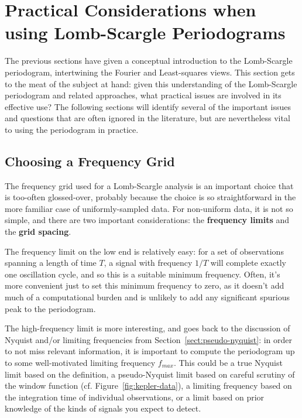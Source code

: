 \documentclass[preprint]{aastex}
\newcommand{\fig}[1]{Figure~\ref{fig:#1}}
\newcommand{\Sect}[1]{Section~\ref{sect:#1}}
\newcommand{\sect}[1]{\Sect{#1}}
\newcommand{\sectlabel}[1]{\label{sect:#1}}
\begin{document}
\section{Practical Considerations when using Lomb-Scargle Periodograms}
\sectlabel{practical-considerations}
The previous sections have given a conceptual introduction to the Lomb-Scargle
periodogram, intertwining the Fourier and Least-squares views.
This section gets to the meat of the subject at hand:
given this understanding of the Lomb-Scargle periodogram and related
approaches, what practical issues are involved in its effective use?
The following sections will identify several of the important issues and
questions that are often ignored in the literature, but are nevertheless
vital to using the periodogram in practice.

\subsection{Choosing a Frequency Grid}
\sectlabel{frequency-grid}
The frequency grid used for a Lomb-Scargle analysis is an important choice
that is too-often glossed-over, probably because the choice is so
straightforward in the more familiar case of uniformly-sampled data.
For non-uniform data, it is not so simple, and there are two important
considerations: the {\bf frequency limits} and the {\bf grid spacing}.

The frequency limit on the low end is relatively easy: for a set of observations
spanning a length of time $T$,
a signal with frequency $1/T$ will complete exactly one oscillation cycle,
and so this is a suitable minimum frequency.
Often, it's more convenient just to set this minimum frequency to zero, as it
doesn't add much of a computational burden and is unlikely to add any
significant spurious peak to the periodogram.

The high-frequency limit is more interesting, and goes back to the discussion
of Nyquist and/or limiting frequencies from \sect{pseudo-nyquist}:
in order to not miss relevant information, it is important to compute the
periodogram up to some well-motivated limiting frequency $f_{max}$. This could
be a true Nyquist limit based on the \citet{Eyer99} definition, a pseudo-Nyquist
limit based on careful scrutiny of the window function (cf. \fig{kepler-data}),
a limiting frequency based on the integration time of individual
observations, or a limit based on prior knowledge of the kinds of signals
you expect to detect.
\end{document}

